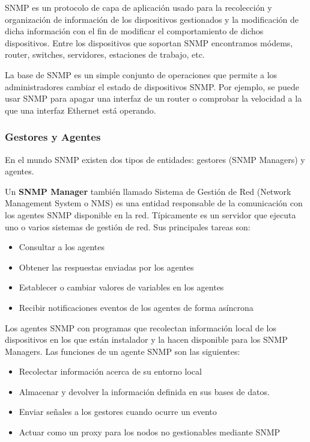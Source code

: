 \gls{SNMP} es un protocolo de capa de aplicación usado para la recolección y organización de
información de los dispositivos gestionados y la modificación de dicha información con el fin de modificar el comportamiento de dichos dispositivos. Entre los dispositivos que soportan SNMP encontramos módems, router, switches, servidores, estaciones de trabajo, etc.

La base de SNMP es un simple conjunto de operaciones que permite a los administradores cambiar el
estado de dispositivos SNMP. Por ejemplo, se puede usar SNMP para apagar una interfaz de un router o
comprobar la velocidad a la que una interfaz Ethernet está operando. 

\subsubsection{Gestores y Agentes}

En el mundo SNMP existen dos tipos de entidades: gestores (SNMP Managers) y agentes. 

Un \textbf{SNMP Manager} también llamado Sistema de Gestión de Red (Network Management System o NMS)
es una entidad responsable de la comunicación con los agentes SNMP disponible en la red. Típicamente
es un servidor que ejecuta uno o varios sistemas de gestión de red. Sus principales tareas son:

\begin{itemize}
    \item Consultar a los agentes
    \item Obtener las respuestas enviadas por los agentes
    \item Establecer o cambiar valores de variables en los agentes
    \item Recibir notificaciones eventos de los agentes de forma asíncrona
\end{itemize}

Los agentes SNMP con programas que recolectan información local de los dispositivos en los que están
instalador y la hacen disponible para los SNMP Managers. Las funciones de un agente SNMP son las
siguientes:

\begin{itemize}
    \item Recolectar información acerca de su entorno local
    \item Almacenar y devolver la información definida en sus bases de datos.
    \item Enviar señales a los gestores cuando ocurre un evento
    \item Actuar como un proxy para los nodos no gestionables mediante SNMP
\end{itemize}

